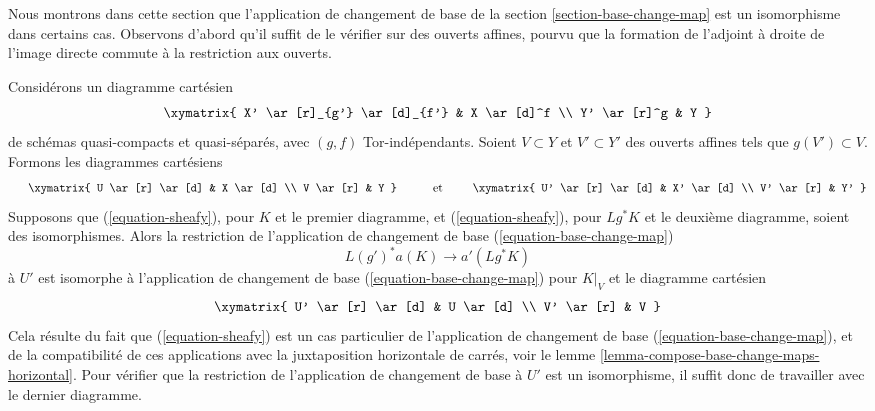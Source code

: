 \noindent
Nous montrons dans cette section que l'application de changement de base de la section \ref{section-base-change-map} est un isomorphisme dans certains cas. Observons d'abord qu'il suffit de le vérifier sur des ouverts affines, pourvu que la formation de l'adjoint à droite de l'image directe commute à la restriction aux ouverts.

\begin{remark}
\label{remark-check-over-affines}
Considérons un diagramme cartésien
$$
\xymatrix{
X' \ar[r]_{g'} \ar[d]_{f'} & X \ar[d]^f \\
Y' \ar[r]^g & Y
}
$$
de schémas quasi-compacts et quasi-séparés, avec $(g, f)$ Tor-indépendants. Soient $V \subset Y$ et $V' \subset Y'$ des ouverts affines tels que $g(V') \subset V$. Formons les diagrammes cartésiens
$$
\vcenter{
\xymatrix{
U \ar[r] \ar[d] & X \ar[d] \\
V \ar[r] & Y
}
}
\quad\text{et}\quad
\vcenter{
\xymatrix{
U' \ar[r] \ar[d] & X' \ar[d] \\
V' \ar[r] & Y'
}
}
$$
Supposons que (\ref{equation-sheafy}), pour $K$ et le premier diagramme, et (\ref{equation-sheafy}), pour $Lg^*K$ et le deuxième diagramme, soient des isomorphismes. Alors la restriction de l'application de changement de base (\ref{equation-base-change-map})
$$
L(g')^*a(K) \longrightarrow a'(Lg^*K)
$$
à $U'$ est isomorphe à l'application de changement de base (\ref{equation-base-change-map}) pour $K|_V$ et le diagramme cartésien
$$
\xymatrix{
U' \ar[r] \ar[d] & U \ar[d] \\
V' \ar[r] & V
}
$$
Cela résulte du fait que (\ref{equation-sheafy}) est un cas particulier de l'application de changement de base (\ref{equation-base-change-map}), et de la compatibilité de ces applications avec la juxtaposition horizontale de carrés, voir le lemme \ref{lemma-compose-base-change-maps-horizontal}. Pour vérifier que la restriction de l'application de changement de base à $U'$ est un isomorphisme, il suffit donc de travailler avec le dernier diagramme.
\end{remark}

